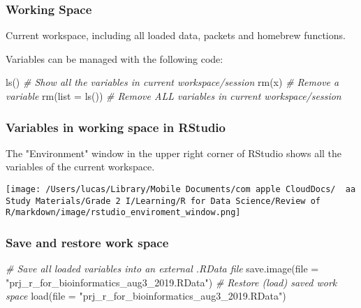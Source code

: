 \documentclass[
]{article}
\let\oldincludegraphics\includegraphics
\renewcommand{\includegraphics}[2][]{\begin{center}\oldincludegraphics[#1]{#2}\end{center}}
\newenvironment{Shaded}{}{}
\newcommand{\AttributeTok}[1]{\textcolor[rgb]{0.49,0.56,0.16}{#1}}
\newcommand{\CommentTok}[1]{\textcolor[rgb]{0.38,0.63,0.69}{\textit{#1}}}
\newcommand{\FunctionTok}[1]{\textcolor[rgb]{0.02,0.16,0.49}{#1}}
\newcommand{\NormalTok}[1]{#1}
\newcommand{\StringTok}[1]{\textcolor[rgb]{0.25,0.44,0.63}{#1}}
\begin{document}
\hypertarget{working-space}{%
\subsubsection{Working Space}\label{working-space}}

Current workspace, including all loaded data, packets and homebrew
functions.

Variables can be managed with the following code:

\begin{Shaded}
\begin{Highlighting}[]
\FunctionTok{ls}\NormalTok{() }\CommentTok{\# Show all the variables in current workspace/session}
\FunctionTok{rm}\NormalTok{(x) }\CommentTok{\# Remove a variable}
\FunctionTok{rm}\NormalTok{(}\AttributeTok{list =} \FunctionTok{ls}\NormalTok{()) }\CommentTok{\# Remove ALL variables in current workspace/session}
\end{Highlighting}
\end{Shaded}

\hypertarget{variables-in-working-space-in-rstudio}{%
\subsubsection{Variables in working space in
RStudio}\label{variables-in-working-space-in-rstudio}}

The "Environment" window in the upper right corner of RStudio shows all
the variables of the current workspace.

\texttt{[image: /Users/lucas/Library/Mobile Documents/com~apple~CloudDocs/~~aa Study Materials/Grade 2 I/Learning/R for Data Science/Review of R/markdown/image/rstudio\_enviroment\_window.png]}

\hypertarget{save-and-restore-work-space}{%
\subsubsection{Save and restore work
space}\label{save-and-restore-work-space}}

\begin{Shaded}
\begin{Highlighting}[]
\CommentTok{\# Save all loaded variables into an external .RData file}
\FunctionTok{save.image}\NormalTok{(}\AttributeTok{file =} \StringTok{"prj\_r\_for\_bioinformatics\_aug3\_2019.RData"}\NormalTok{) }
\CommentTok{\# Restore (load) saved work space}
\FunctionTok{load}\NormalTok{(}\AttributeTok{file =} \StringTok{"prj\_r\_for\_bioinformatics\_aug3\_2019.RData"}\NormalTok{)}
\end{Highlighting}
\end{Shaded}
\end{document}
